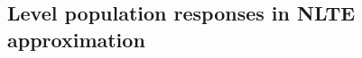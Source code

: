 \documentclass[referee]{aa}
\begin{document}

\subsection{Level population responses in NLTE approximation}
\label{nlte_lvls}



\end{document}
